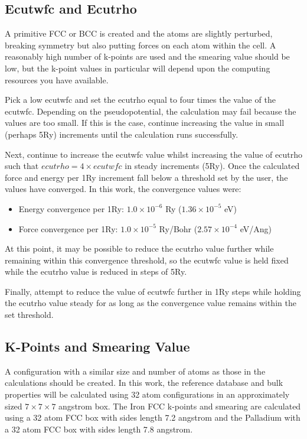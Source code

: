 \subsection{Ecutwfc and Ecutrho}

A primitive FCC or BCC is created and the atoms are slightly perturbed, breaking symmetry but also putting forces on each atom within the cell.  A reasonably high number of k-points are used and the smearing value should be low, but the k-point values in particular will depend upon the computing resources you have available.

Pick a low ecutwfc and set the ecutrho equal to four times the value of the ecutwfc.  Depending on the pseudopotential, the calculation may fail because the values are too small.  If this is the case, continue increasing the value in small (perhaps 5Ry) increments until the calculation runs successfully.

Next, continue to increase the ecutwfc value whilst increasing the value of ecutrho such that $ecutrho = 4 \times ecutwfc$ in steady increments (5Ry).  Once the calculated force and energy per 1Ry increment fall below a threshold set by the user, the values have converged.  In this work, the convergence values were:

\begin{itemize}
\item Energy convergence per 1Ry: $1.0 \times 10^{-6}$ Ry ($1.36 \times 10^{-5}$ eV)
\item Force convergence per 1Ry: $1.0 \times 10^{-5}$ Ry/Bohr ($2.57 \times 10^{-4}$ eV/Ang)
\end{itemize}

At this point, it may be possible to reduce the ecutrho value further while remaining within this convergence threshold, so the ecutwfc value is held fixed while the ecutrho value is reduced in steps of 5Ry.

Finally, attempt to reduce the value of ecutwfc further in 1Ry steps while holding the ecutrho value steady for as long as the convergence value remains within the set threshold.

\subsection{K-Points and Smearing Value}

A configuration with a similar size and number of atoms as those in the calculations should be created.  In this work, the reference database and bulk properties will be calculated using 32 atom configurations in an approximately sized $7 \times 7 \times 7$ angstrom box.  The Iron FCC k-points and smearing are calculated using a 32 atom FCC box with sides length 7.2 angstrom and the Palladium with a 32 atom FCC box with sides length 7.8 angstrom.

